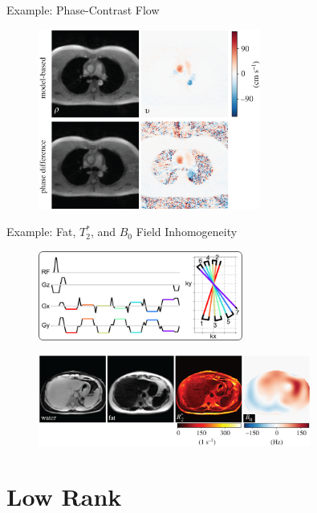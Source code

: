 \documentclass[aspectratio=169]{beamer}
\begin{document}
	\begin{frame}{Example: Phase-Contrast Flow}
		\begin{figure}
			\centering
			\includegraphics[width=0.65\textwidth]{figures/flow.jpg}
		\end{figure}
	\end{frame}
	
	\begin{frame}{Example: Fat, $T_2^*$, and $B_0$ Field Inhomogeneity}
		\begin{figure}
			\centering
			\includegraphics[width=0.6\textwidth]{figures/meco.png}
		\end{figure}
		
		\begin{figure}
			\centering
			\includegraphics[width=0.8\textwidth]{figures/meco_liver.jpg}
		\end{figure}
	\end{frame}
	
	\section{Low Rank}
	
\end{document}
